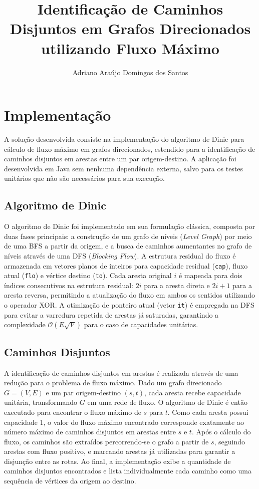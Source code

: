 \documentclass[12pt]{article}
\title{Identificação de Caminhos Disjuntos em Grafos Direcionados utilizando Fluxo Máximo}
\author{Adriano Araújo Domingos dos Santos\inst{1}}
\begin{document}
 

\maketitle

\section{Implementação}

A solução desenvolvida consiste na implementação do algoritmo de Dinic para cálculo de fluxo máximo em grafos direcionados, estendido para a identificação de caminhos disjuntos em arestas entre um par origem-destino. A aplicação foi desenvolvida em Java sem nenhuma dependência externa, salvo para os testes unitários que não são necessários para sua execução.

\subsection{Algoritmo de Dinic} \label{dinic}

O algoritmo de Dinic foi implementado em sua formulação clássica, composta por duas fases principais: a construção de um grafo de níveis (\textit{Level Graph}) por meio de uma BFS a partir da origem, e a busca de caminhos aumentantes no grafo de níveis através de uma DFS (\textit{Blocking Flow}). A estrutura residual do fluxo é armazenada em vetores planos de inteiros para capacidade residual (\texttt{cap}), fluxo atual (\texttt{flo}) e vértice destino (\texttt{to}). Cada aresta original $i$ é mapeada para dois índices consecutivos na estrutura residual: $2i$ para a aresta direta e $2i+1$ para a aresta reversa, permitindo a atualização do fluxo em ambos os sentidos utilizando o operador XOR. A otimização de ponteiro atual (vetor \texttt{it}) é empregada na DFS para evitar a varredura repetida de arestas já saturadas, garantindo a complexidade $\mathcal{O}(E \sqrt{V})$ para o caso de capacidades unitárias.

\subsection{Caminhos Disjuntos} \label{disjointpaths}

A identificação de caminhos disjuntos em arestas é realizada através de uma redução para o problema de fluxo máximo. Dado um grafo direcionado $G = (V, E)$ e um par origem-destino $(s, t)$, cada aresta recebe capacidade unitária, transformando $G$ em uma rede de fluxo. O algoritmo de Dinic é então executado para encontrar o fluxo máximo de $s$ para $t$. Como cada aresta possui capacidade $1$, o valor do fluxo máximo encontrado corresponde exatamente ao número máximo de caminhos disjuntos em arestas entre $s$ e $t$. Após o cálculo do fluxo, os caminhos são extraídos percorrendo-se o grafo a partir de $s$, seguindo arestas com fluxo positivo, e marcando arestas já utilizadas para garantir a disjunção entre as rotas. Ao final, a implementação exibe a quantidade de caminhos disjuntos encontrados e lista individualmente cada caminho como uma sequência de vértices da origem ao destino.
\end{document}
